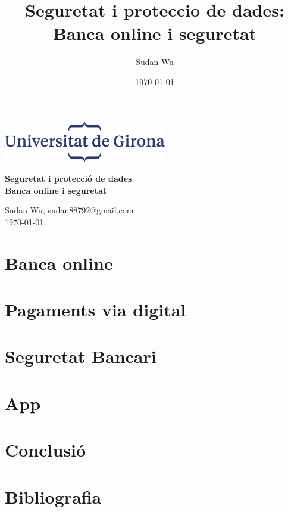 \documentclass[12pt,a4paper]{article}
\title{Seguretat i proteccio de dades: Banca online i seguretat}
\author{Sudan Wu}
\date{\today}
\begin{document}
\begin{titlepage}
    \begin{center}
        \includegraphics[height=1.8cm]{logoUdG}\\\vfill
    \end{center}
    \center
    {\huge \bfseries Seguretat i protecció de dades}\\[0.5cm]
    {\Huge \bfseries Banca online i seguretat} \\
    \vfill
    \begin{center} \large
        {Sudan Wu, sudan88792@gmail.com} \\[0.25cm]
        {\today}\\ [1cm]
    \end{center}

\end{titlepage}

\tableofcontents


\clearpage
\section{Banca online}


\section{Pagaments via digital}


\section{Seguretat Bancari}


\section{App}



\section{Conclusió}


\clearpage
\section{Bibliografia}

\end{document}
